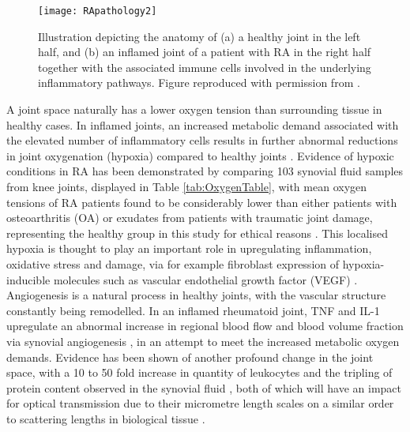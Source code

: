 \documentclass[twoside]{bhamthesis}
\theoremstyle{definition}
\begin{document}
\begin{figure}[!ht]
\centering
  \centering
  \texttt{[image: RApathology2]}
\caption[Illustration depicting the anatomy of (a) a healthy joint in the left half, and (b) an inflamed joint of a patient with RA in the right half together with the associated immune cells involved in the underlying inflammatory pathways.]{Illustration depicting the anatomy of (a) a healthy joint in the left half, and (b) an inflamed joint of a patient with RA in the right half together with the associated immune cells involved in the underlying inflammatory pathways. Figure reproduced with permission from \cite{strand2007biologic}.}
  \label{fig:RApathology2}
\end{figure}

A joint space naturally has a lower oxygen tension than surrounding tissue in healthy cases. In inflamed joints, an increased metabolic demand associated with the elevated number of inflammatory cells results in further abnormal reductions in joint oxygenation (hypoxia) compared to healthy joints \cite{ng2010synovial}. Evidence of hypoxic conditions in RA has been demonstrated by comparing 103 synovial fluid samples from knee joints, displayed in Table \ref{tab:OxygenTable}, with mean oxygen tensions of RA patients found to be considerably lower than either patients with osteoarthritis (OA) or exudates from patients with traumatic joint damage, representing the healthy group in this study for ethical reasons \cite{lund1970oxygen}. This localised hypoxia is thought to play an important role in upregulating inflammation, oxidative stress and damage, via for example fibroblast expression of hypoxia-inducible molecules such as vascular endothelial growth factor (VEGF) \cite{konisti2012hypoxia, akhavani2009hypoxia}. Angiogenesis is a natural process in healthy joints, with the vascular structure constantly being remodelled. In an inflamed rheumatoid joint, TNF and IL-1 upregulate an abnormal increase in regional blood flow and blood volume fraction via synovial angiogenesis \cite{falchuk1970respiratory}, in an attempt to meet the increased metabolic oxygen demands. Evidence has been shown of another profound change in the joint space, with a 10 to 50 fold increase in quantity of leukocytes and the tripling of protein content observed in the synovial fluid \cite{mohamed1990morphology,dahlberg1992proteoglycan}, both of which will have an impact for optical transmission due to their micrometre length scales on a similar order to scattering lengths in biological tissue .
\end{document}
